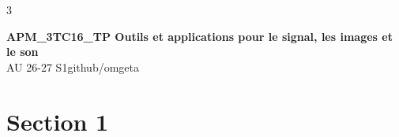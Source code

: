 \documentclass[12pt, a4paper]{article}
\newcommand{\mytitle}{APM\_3TC16\_TP Outils et applications pour le signal, les images et le son}
\newcommand{\myauthor}{github/omgeta}
\newcommand{\mydate}{AU 26-27 S1}
\begin{document}
\raggedright
\footnotesize
\begin{multicols*}{3}
\setlength{\premulticols}{1pt}
\setlength{\postmulticols}{1pt}
\setlength{\multicolsep}{1pt}
\setlength{\columnsep}{2pt}

{\normalsize{\textbf{\mytitle}}}\\
{\footnotesize{\mydate\hspace{2pt}\textemdash\hspace{2pt}\myauthor}}
\section{Section 1}
\end{multicols*}
\end{document}
